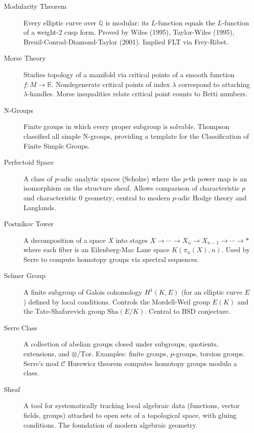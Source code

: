 \begin{description}
    \item[Modularity Theorem] Every elliptic curve over $\mathbb{Q}$ is modular: its $L$-function equals the $L$-function of a weight-2 cusp form. Proved by Wiles (1995), Taylor-Wiles (1995), Breuil-Conrad-Diamond-Taylor (2001). Implied FLT via Frey-Ribet.

    \item[Morse Theory] Studies topology of a manifold via critical points of a smooth function $f: M \to \mathbb{R}$. Nondegenerate critical points of index $\lambda$ correspond to attaching $\lambda$-handles. Morse inequalities relate critical point counts to Betti numbers.

    \item[N-Groups] Finite groups in which every proper subgroup is solvable. Thompson classified all simple N-groups, providing a template for the Classification of Finite Simple Groups.

    \item[Perfectoid Space] A class of $p$-adic analytic spaces (Scholze) where the $p$-th power map is an isomorphism on the structure sheaf. Allows comparison of characteristic $p$ and characteristic 0 geometry; central to modern $p$-adic Hodge theory and Langlands.

    \item[Postnikov Tower] A decomposition of a space $X$ into stages $X \to \cdots \to X_n \to X_{n-1} \to \cdots \to *$ where each fiber is an Eilenberg-Mac Lane space $K(\pi_n(X), n)$. Used by Serre to compute homotopy groups via spectral sequences.

    \item[Selmer Group] A finite subgroup of Galois cohomology $H^1(K, E)$ (for an elliptic curve $E$) defined by local conditions. Controls the Mordell-Weil group $E(K)$ and the Tate-Shafarevich group $\mathrm{Sha}(E/K)$. Central to BSD conjecture.

    \item[Serre Class] A collection of abelian groups closed under subgroups, quotients, extensions, and $\otimes$/$\mathrm{Tor}$. Examples: finite groups, $p$-groups, torsion groups. Serre's mod $\mathcal{C}$ Hurewicz theorem computes homotopy groups modulo a class.

    \item[Sheaf] A tool for systematically tracking local algebraic data (functions, vector fields, groups) attached to open sets of a topological space, with gluing conditions. The foundation of modern algebraic geometry.


\end{description}
